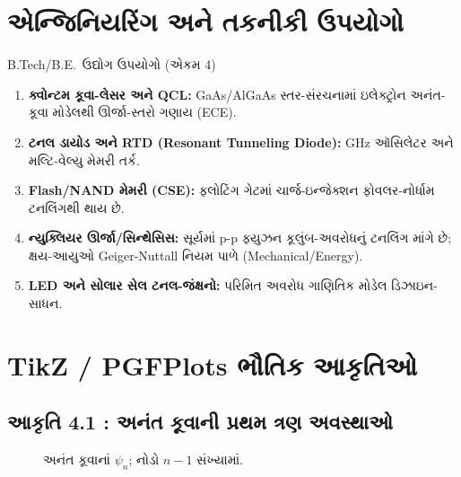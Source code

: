 \section{એન્જિનિયરિંગ અને તકનીકી ઉપયોગો}
\begin{upayogbox}{B.Tech/B.E.\ ઉદ્યોગ ઉપયોગો (એકમ 4)}
\begin{enumerate}[label=\textbullet]
  \item \textbf{ક્વોન્ટમ કૂવા-લેસર અને QCL:} GaAs/AlGaAs સ્તર-સંરચનામાં ઇલેક્ટ્રોન અનંત-કૂવા મોડેલથી ઊર્જા-સ્તરો ગણાય (ECE).
  \item \textbf{ટનલ ડાયોડ અને RTD (Resonant Tunneling Diode):} GHz ઑસિલેટર અને મલ્ટિ-વેલ્યુ મેમરી તર્ક.
  \item \textbf{Flash/NAND મેમરી (CSE):} ફ્લોટિંગ ગેટમાં ચાર્જ-ઇન્જેક્શન ફોવલર-નોર્ધામ ટનલિંગથી થાય છે.
  \item \textbf{ન્યુક્લિયર ઊર્જા/સિન્થેસિસ:} સૂર્યમાં p-p ફ્યુઝન કૂલુંબ-અવરોધનું ટનલિંગ માંગે છે; ક્ષય-આયુઓ Geiger-Nuttall નિયમ પાળે (Mechanical/Energy).
  \item \textbf{LED અને સોલાર સેલ ટનલ-જંક્ષનો:} પરિમિત અવરોધ ગાણિતિક મોડેલ ડિઝાઇન-સાધન.
\end{enumerate}
\end{upayogbox}

\section{TikZ / PGFPlots ભૌતિક આકૃતિઓ}

\subsection*{આકૃતિ 4.1 : અનંત કૂવાની પ્રથમ ત્રણ અવસ્થાઓ}
\begin{figure}[htbp]
\centering
{}
\caption{અનંત કૂવાનાં $\psi_n$; નોડો $n-1$ સંખ્યામાં.}
\end{figure}

